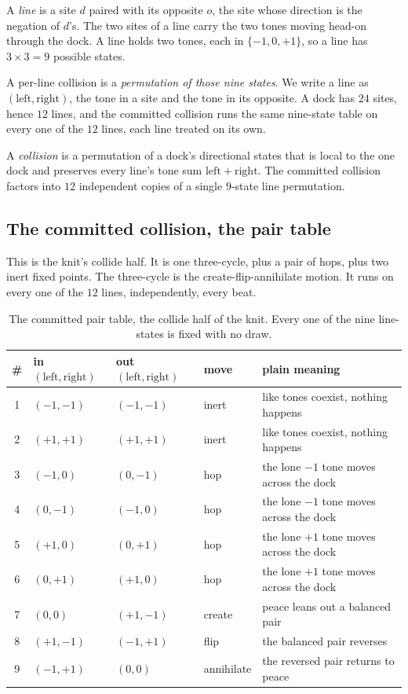 A \emph{line} is a site $d$ paired with its opposite $o$, the site whose direction is the negation of $d$'s. The two sites of a line carry the two tones moving head-on through the dock. A line holds two tones, each in $\{-1, 0, +1\}$, so a line has $3 \times 3 = 9$ possible states.

A per-line collision is a \emph{permutation of those nine states}. We write a line as $(\mathrm{left}, \mathrm{right})$, the tone in a site and the tone in its opposite. A dock has $24$ sites, hence $12$ lines, and the committed collision runs the same nine-state table on every one of the $12$ lines, each line treated on its own.

\begin{definition}[A collision]
A \emph{collision} is a permutation of a dock's directional states that is local to the one dock and preserves every line's tone sum $\mathrm{left} + \mathrm{right}$. The committed collision factors into $12$ independent copies of a single $9$-state line permutation.
\end{definition}

\subsection{The committed collision, the pair table}

This is the knit's collide half. It is one three-cycle, plus a pair of hops, plus two inert fixed points. The three-cycle is the create-flip-annihilate motion. It runs on every one of the $12$ lines, independently, every beat.

\begin{table}[ht]
\centering
\begin{tabular}{@{}cllll@{}}
\toprule
\# & in $(\mathrm{left}, \mathrm{right})$ & out $(\mathrm{left}, \mathrm{right})$ & move & plain meaning \\
\midrule
1 & $(-1, -1)$ & $(-1, -1)$ & inert & like tones coexist, nothing happens \\
2 & $(+1, +1)$ & $(+1, +1)$ & inert & like tones coexist, nothing happens \\
3 & $(-1, 0)$ & $(0, -1)$ & hop & the lone $-1$ tone moves across the dock \\
4 & $(0, -1)$ & $(-1, 0)$ & hop & the lone $-1$ tone moves across the dock \\
5 & $(+1, 0)$ & $(0, +1)$ & hop & the lone $+1$ tone moves across the dock \\
6 & $(0, +1)$ & $(+1, 0)$ & hop & the lone $+1$ tone moves across the dock \\
7 & $(0, 0)$ & $(+1, -1)$ & create & peace leans out a balanced pair \\
8 & $(+1, -1)$ & $(-1, +1)$ & flip & the balanced pair reverses \\
9 & $(-1, +1)$ & $(0, 0)$ & annihilate & the reversed pair returns to peace \\
\bottomrule
\end{tabular}
\caption{The committed pair table, the collide half of the knit. Every one of the nine line-states is fixed with no draw.}
\label{tab:pair-table-forward}
\end{table}

